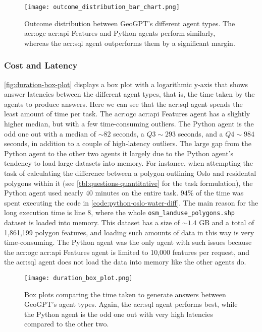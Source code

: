 \begin{figure}[htbp]
    \centering
    \texttt{[image: outcome\_distribution\_bar\_chart.png]}
    \caption[Outcome distribution between GeoGPT's different agent types]{Outcome distribution between GeoGPT's different agent types. The \acrshort{acr:ogc} \acrshort{acr:api} Features and Python agents perform similarly, whereas the \acrshort{acr:sql} agent outperforms them by a significant margin.}
    \label{fig:outcome-distribution}
\end{figure}

\subsubsection{Cost and Latency}

\autoref{fig:duration-box-plot} displays a box plot with a logarithmic y-axis that shows answer latencies between the different agent types, that is, the time taken by the agents to produce answers. Here we can see that the \acrshort{acr:sql} agent spends the least amount of time per task. The \acrshort{acr:ogc} \acrshort{acr:api} Features agent has a slightly higher median, but with a few time-consuming outliers. The Python agent is the odd one out with a median of $\sim 82$ seconds, a $Q3 \sim 293$ seconds, and a $Q4 \sim 984$ seconds, in addition to a couple of high-latency outliers. The large gap from the Python agent to the other two agents it largely due to the Python agent's tendency to load large datasets into memory. For instance, when attempting the task of calculating the difference between a polygon outlining Oslo and residental polygons within it (see \autoref{tbl:questions-quantitative} for the task formulation), the Python agent used nearly 40 minutes on the entire task. $94\%$ of the time was spent executing the code in \autoref{code:python-oslo-water-diff}. The main reason for the long execution time is line 8, where the whole \texttt{osm\_landuse\_polygons.shp} dataset is loaded into memory. This dataset has a size of $\sim 1.4 \text{ GB}$ and a total of 1,861,199 polygon features, and loading such amounts of data in this way is very time-consuming. The Python agent was the only agent with such issues because the \acrshort{acr:ogc} \acrshort{acr:api} Features agent is limited to 10,000 features per request, and the \acrshort{acr:sql} agent does not load the data into memory like the other agents do.

\begin{figure}[htbp]
    \centering
    \texttt{[image: duration\_box\_plot.png]}
    \caption[Box plots comparing the time taken to generate answers between GeoGPT's agent types]{Box plots comparing the time taken to generate answers between GeoGPT's agent types. Again, the \acrshort{acr:sql} agent performs best, while the Python agent is the odd one out with very high latencies compared to the other two.}
    \label{fig:duration-box-plot}
\end{figure}

